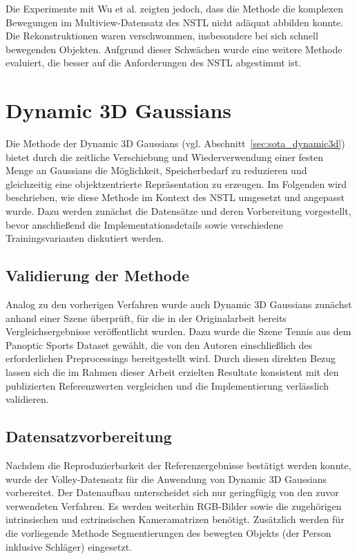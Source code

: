 Die Experimente mit Wu et al. zeigten jedoch, dass die Methode die komplexen Bewegungen im Multiview-Datensatz des NSTL nicht adäquat abbilden konnte. Die Rekonstruktionen waren verschwommen, insbesondere bei sich schnell bewegenden Objekten.
Aufgrund dieser Schwächen wurde eine weitere Methode evaluiert, die besser auf die
Anforderungen des NSTL abgestimmt ist.




\section{Dynamic 3D Gaussians}
\label{sec:method_dynamic3d}

Die Methode der Dynamic 3D Gaussians (vgl. Abschnitt~\ref{sec:sota_dynamic3d}) bietet durch die zeitliche Verschiebung und Wiederverwendung einer festen Menge an Gaussians die Möglichkeit, Speicherbedarf zu reduzieren und gleichzeitig eine objektzentrierte Repräsentation zu erzeugen. 
Im Folgenden wird beschrieben, wie diese Methode im Kontext des NSTL umgesetzt und angepasst wurde. 
Dazu werden zunächst die Datensätze und deren Vorbereitung vorgestellt, bevor anschließend die Implementationsdetails sowie verschiedene Trainingsvarianten diskutiert werden. 


\subsection{Validierung der Methode}

Analog zu den vorherigen Verfahren wurde auch Dynamic 3D Gaussians zunächst anhand einer Szene überprüft, für die in der Originalarbeit bereits Vergleichsergebnisse veröffentlicht wurden.
Dazu wurde die Szene Tennis aus dem Panoptic Sports Dataset gewählt, die von den Autoren einschließlich des erforderlichen Preprocessings bereitgestellt wird.
Durch diesen direkten Bezug lassen sich die im Rahmen dieser Arbeit erzielten Resultate konsistent mit den publizierten Referenzwerten vergleichen und die Implementierung verlässlich validieren.


\subsection{Datensatzvorbereitung}

Nachdem die Reproduzierbarkeit der Referenzergebnisse bestätigt werden konnte, wurde der Volley-Datensatz für die Anwendung von Dynamic 3D Gaussians vorbereitet. 
Der Datenaufbau unterscheidet sich nur geringfügig von den zuvor verwendeten Verfahren.
Es werden weiterhin RGB-Bilder sowie die zugehörigen intrinsischen und extrinsischen Kameramatrizen benötigt.
Zusätzlich werden für die vorliegende Methode Segmentierungen des bewegten Objekts (der Person inklusive Schläger) eingesetzt.

